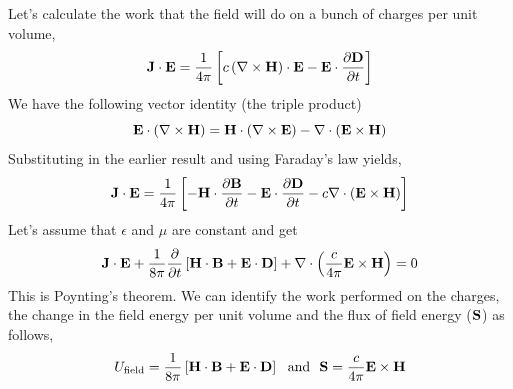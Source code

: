 Let's calculate the work that the field will do on a bunch of charges
per unit volume,
\begin{equation}
{\bf J} \cdot {\bf E} = \frac{1}{4\pi} \left [ c \left ({\bf \nabla}
  \times {\bf H} \right ) \cdot {\bf E} - {\bf E} \cdot 
\frac{\partial {\bf D}}{\partial {t}} \right ]
\label{eq:132}
\end{equation}
We have the following vector identity (the triple product)
\begin{equation}
{\bf E} \cdot  \left ({\bf \nabla}
  \times {\bf H} \right ) = 
{\bf H} \cdot  \left ({\bf \nabla}
  \times {\bf E} \right ) - 
{\bf \nabla}  \cdot  \left ({\bf E}
  \times {\bf H} \right ) 
\label{eq:133}
\end{equation}
Substituting in the earlier result and using Faraday's law yields,
\begin{equation}
{\bf J} \cdot {\bf E} = \frac{1}{4\pi} \left [ - {\bf H} \cdot
  \frac{\partial {\bf B}}{\partial {t}} 
- {\bf E} \cdot 
\frac{\partial {\bf D}}{\partial {t}} 
- c
{\bf \nabla}  \cdot  \left ({\bf E}
  \times {\bf H} \right ) 
 \right ]
\label{eq:134}
\end{equation}
Let's assume that $\epsilon$ and $\mu$ are constant and get
\begin{equation}
{\bf J} \cdot {\bf E} + \frac{1}{8\pi} 
\frac{\partial {}}{\partial {t}} 
\left [ {\bf H} \cdot {\bf B}
+  {\bf E} \cdot  {\bf D} \right ] + {\bf \nabla}  \cdot  \left ( \frac{c}{4\pi}
{\bf E}  \times {\bf H} \right ) = 0
\label{eq:135}
\end{equation}
This is Poynting's theorem.  We can identify the work performed on the
charges, the change in the field energy per unit volume and the flux
of field energy (${\bf S}$) as follows,
\begin{equation}
U_{ \hbox{\rm \scriptsize field}} = \frac{1}{8\pi} \left [ {\bf H} \cdot {\bf B}
+  {\bf E} \cdot  {\bf D} \right ] ~~\hbox{\rm and}~~ {\bf S} = \frac{c}{4\pi} {\bf E}
  \times {\bf H}
\label{eq:136}
\end{equation}

